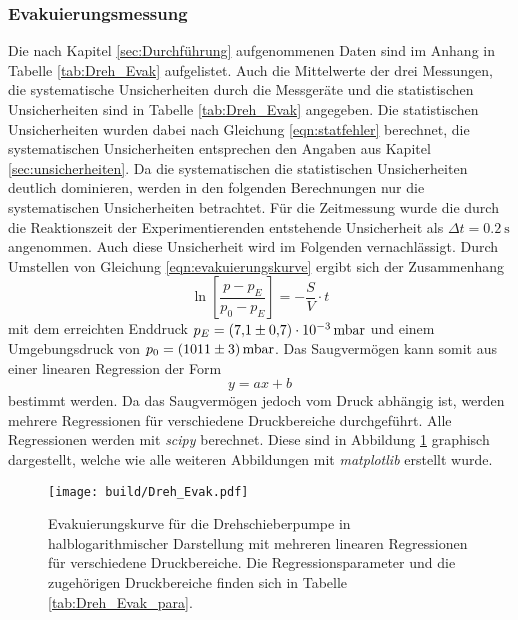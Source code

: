\subsubsection{Evakuierungsmessung}
Die nach Kapitel \ref{sec:Durchführung} aufgenommenen Daten sind im Anhang in Tabelle \ref{tab:Dreh_Evak}
aufgelistet. Auch die Mittelwerte der drei Messungen, die systematische Unsicherheiten durch die 
Messgeräte und die statistischen Unsicherheiten sind in Tabelle \ref{tab:Dreh_Evak} angegeben. 
Die statistischen Unsicherheiten wurden dabei nach Gleichung \ref{eqn:statfehler} berechnet, 
die systematischen Unsicherheiten entsprechen den Angaben aus Kapitel \ref{sec:unsicherheiten}.
Da die systematischen die statistischen Unsicherheiten deutlich dominieren, werden in den 
folgenden Berechnungen nur die systematischen Unsicherheiten betrachtet. Für die Zeitmessung 
wurde die durch die Reaktionszeit der Experimentierenden entstehende Unsicherheit als 
$\Delta t=\SI{0.2}{\second}$ angenommen. Auch diese Unsicherheit wird im Folgenden vernachlässigt.
Durch Umstellen von Gleichung \ref{eqn:evakuierungskurve} ergibt sich der Zusammenhang
\begin{equation*}
  \ln{\left[\frac{p-p_E}{p_0-p_E}\right]}=-\frac{S}{V}\cdot t
\end{equation*}
mit dem erreichten Enddruck ${p_E=\SI{7.1\pm 0.7 e-3}{\milli\bar}}$ und einem Umgebungsdruck
von ${p_0=\SI{1011 \pm 3}{\milli\bar}}$. 
Das Saugvermögen kann somit aus einer linearen Regression der Form 
\begin{equation}
  y=ax+b
  \label{eqn:gerade}
\end{equation}
bestimmt werden. Da das Saugvermögen jedoch vom Druck abhängig ist, werden mehrere 
Regressionen für verschiedene Druckbereiche durchgeführt. Alle Regressionen werden 
mit \textit{scipy} \cite{scipy} berechnet. Diese sind in Abbildung 
\ref{fig:dreh_evak} graphisch dargestellt, welche wie alle weiteren Abbildungen 
mit \textit{matplotlib} \cite{matplotlib} erstellt wurde.
\begin{figure}[H]
    \centering
    \texttt{[image: build/Dreh\_Evak.pdf]}
    \caption{Evakuierungskurve für die Drehschieberpumpe in halblogarithmischer Darstellung mit mehreren linearen Regressionen für verschiedene Druckbereiche. Die Regressionsparameter und die zugehörigen Druckbereiche finden sich in Tabelle \ref{tab:Dreh_Evak_para}.}
    \label{fig:dreh_evak}
\end{figure}
